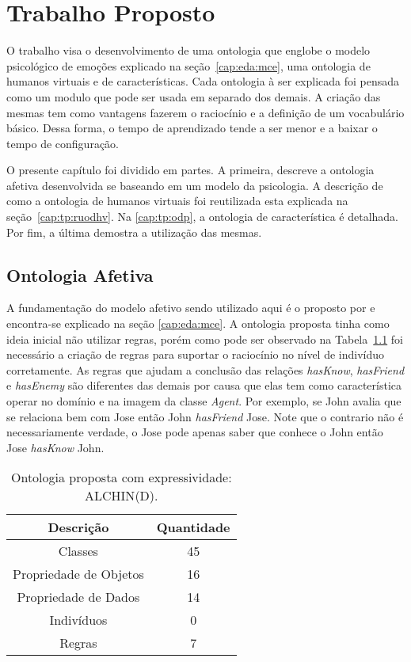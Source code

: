 \chapter{Trabalho Proposto} \label{cap:tp}

O trabalho visa o desenvolvimento de uma ontologia que englobe o modelo
psicológico de emoções explicado na seção~\ref{cap:eda:mce}, uma ontologia de
humanos virtuais e de características. Cada ontologia à ser explicada foi pensada
como um modulo que pode ser usada em separado dos demais. A criação das mesmas
tem como vantagens fazerem o raciocínio e a definição de um vocabulário
básico. Dessa forma, o tempo de aprendizado tende a ser menor e a baixar o
tempo de configuração.

O presente capítulo foi dividido em partes. A primeira, descreve a ontologia
afetiva desenvolvida se baseando em um modelo da psicologia. A descrição de
como a ontologia de humanos virtuais foi reutilizada esta explicada na
seção~\ref{cap:tp:ruodhv}. Na \ref{cap:tp:odp}, a ontologia de característica é
detalhada. Por fim, a última demostra a utilização das mesmas.

\section{Ontologia Afetiva} \label{cap:tp:oa}

A fundamentação do modelo afetivo sendo utilizado aqui é o proposto por
\citet{ortony1988cse} e encontra-se explicado na seção \ref{cap:eda:mce}. A
ontologia proposta tinha como ideia inicial não utilizar regras, porém como
pode ser observado na Tabela~\ref{tab:oa:geral} foi necessário a criação de
regras para suportar o raciocínio no nível de indivíduo corretamente. As
regras que ajudam a conclusão das relações \emph{hasKnow}, \emph{hasFriend} e
\emph{hasEnemy} são diferentes das demais por causa que elas tem como
característica operar no domínio e na imagem da classe \emph{Agent}. Por
exemplo, se John avalia que se relaciona bem com Jose então John
\emph{hasFriend} Jose. Note que o contrario não é necessariamente verdade, o
Jose pode apenas saber que conhece o John então Jose \emph{hasKnow} John.

\begin{table}
	\caption{Ontologia proposta com expressividade: ALCHIN(D).}
	\label{tab:oa:geral}
	\begin{center}
	\begin{tabular}{|c|c|}
		\hline
		Descrição & Quantidade \\ \hline
		Classes &  45 		\\ \hline
		Propriedade de Objetos & 16 \\ \hline
		Propriedade de Dados & 14 \\ \hline
		Indivíduos &  0		\\ \hline
		Regras & 7 \\ \hline
	\end{tabular}
	\end{center}
\end{table}

